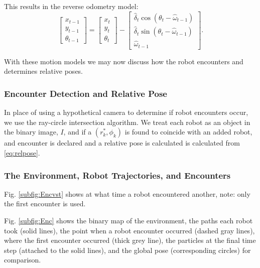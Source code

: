 This results in the reverse odometry model:
\begin{equation}
\begin{bmatrix}
x_{t-1}\\
y_{t-1}\\
\theta_{t-1}
\end{bmatrix}=\begin{bmatrix}
x_{t}\\
y_{t}\\
\theta_{t}
\end{bmatrix}-\begin{bmatrix}
\hat{\delta}_t  \cos(\theta_t-\hat{\omega}_{t-1})\\
\hat{\delta}_{t}\sin(\theta_t-\hat{\omega}_{t-1})\\
\hat{\omega}_{t-1}
\end{bmatrix}.
\label{eq:ReverseOdometryMotion}
\end{equation}

With these motion models we may now discuss how the robot encounters and determines relative poses.  


\subsubsection{Encounter Detection and Relative Pose}

In place of using a hypothetical camera to determine if robot encounters occur, we use the ray-circle intersection algorithm.  We treat each robot as an object in the binary image, $I$, and if a $(r_k^*,\phi_k)$ is found to coincide with an added robot, and encounter is declared and a relative pose is calculated is calculated from \eqref{eq:relpose}.



\subsubsection{The Environment, Robot Trajectories, and Encounters}

  Fig. \ref{subfig:Encvst} shows at what time a robot encountered another, note: only the first encounter is used.

Fig. \ref{subfig:Enc} shows the binary map of the environment, the paths each robot took (solid lines), the point when a robot encounter occurred (dashed gray lines), where the first encounter occurred (thick grey line), the particles at the final time step (attached to the solid lines), and the global pose (corresponding circles) for comparison.

